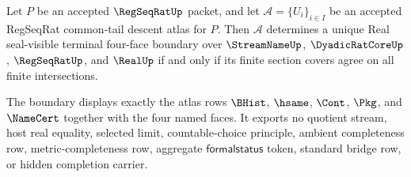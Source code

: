 \begin{theorem}
\label{thm:regseqrat-common-tail-descent-atlas-real-seal-exactness}
Let $P$ be an accepted $\RegSeqRatUp$ packet, and let $\mathcal A=\{U_i\}_{i \in I}$ be an accepted RegSeqRat common-tail descent atlas for $P$. Then $\mathcal A$ determines a unique Real seal-visible terminal four-face boundary over $\StreamNameUp$, $\DyadicRatCoreUp$, $\RegSeqRatUp$, and $\RealUp$ if and only if its finite section covers agree on all finite intersections.

The boundary displays exactly the atlas rows $\BHist$, $\hsame$, $\Cont$, $\Pkg$, and $\NameCert$ together with the four named faces. It exports no quotient stream, host real equality, selected limit, countable-choice principle, ambient completeness row, metric-completeness row, aggregate $\mathsf{formalstatus}$ token, standard bridge row, or hidden completion carrier.
\end{theorem}
